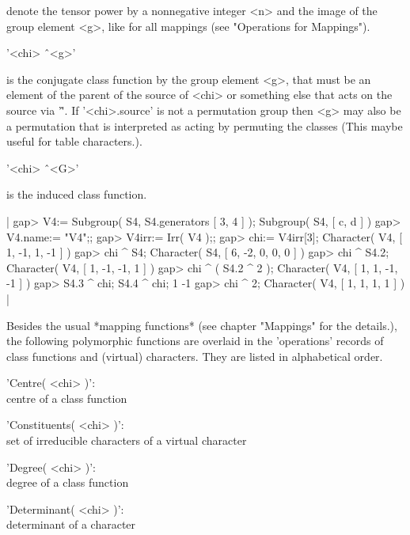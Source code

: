 denote the tensor power by a nonnegative integer <n> and the image of the
group element <g>, like for all mappings (see "Operations for Mappings").

'<chi> \^\ <g>'

is the conjugate class function by the group element <g>, that must
be an element of the parent of the source of <chi> or something else that
acts on the source via '\^'.
If '<chi>.source' is not a permutation group then <g> may also be a
permutation that is interpreted as acting by permuting the classes
(This maybe useful for table characters.).

'<chi> \^\ <G>'

is the induced class function.

|    gap> V4:= Subgroup( S4, S4.generators{ [ 3, 4 ] } );
    Subgroup( S4, [ c, d ] )
    gap> V4.name:= "V4";;
    gap> V4irr:= Irr( V4 );;
    gap> chi:= V4irr[3];
    Character( V4, [ 1, -1, 1, -1 ] )
    gap> chi ^ S4;
    Character( S4, [ 6, -2, 0, 0, 0 ] )
    gap> chi ^ S4.2;
    Character( V4, [ 1, -1, -1, 1 ] )
    gap> chi ^ ( S4.2 ^ 2 );
    Character( V4, [ 1, 1, -1, -1 ] )
    gap> S4.3 ^ chi; S4.4 ^ chi;
    1
    -1
    gap> chi ^ 2;
    Character( V4, [ 1, 1, 1, 1 ] ) |


Besides the usual *mapping functions* (see chapter "Mappings" for
the details.), the following polymorphic functions are overlaid in
the 'operations' records of class functions and (virtual) characters.
They are listed in alphabetical order.


'Centre( <chi> )': \\ centre of a class function

'Constituents( <chi> )': \\ set of irreducible characters of a virtual
                            character

'Degree( <chi> )': \\ degree of a class function

'Determinant( <chi> )': \\  determinant of a character


